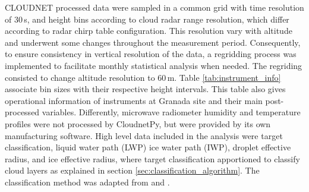 \documentclass[journal abbreviation, manuscript]{copernicus}
\begin{document}
CLOUDNET processed data were sampled in a common grid with time resolution of 30\,s, and height bins according to cloud radar range resolution, which differ according to radar chirp table configuration. 
This resolution vary with altitude and underwent some changes throughout the measurement period. Consequently, to ensure consistency in vertical resolution of the data, a regridding process was implemented to facilitate monthly statistical analysis when needed. The regriding consisted to change altitude resolution to 60\,m. 
Table \ref{tab:instrument_info} associate bin sizes with their respective height intervals. This table also gives operational information of instruments at Granada site and their main post-processed variables. Differently, microwave radiometer humidity and temperature profiles were not processed by CloudnetPy, but were provided by its own manufacturing software.
High level data included in the analysis were target classification, liquid water path (LWP) ice water path (IWP), droplet effective radius, and ice effective radius, where target classification apportioned to classify cloud layers as explained in section \ref{sec:classification_algorithm}. The classification method was adapted from \citet{Pirloaga2022} and \citet{Nomokonova2019}. 

\end{document}
